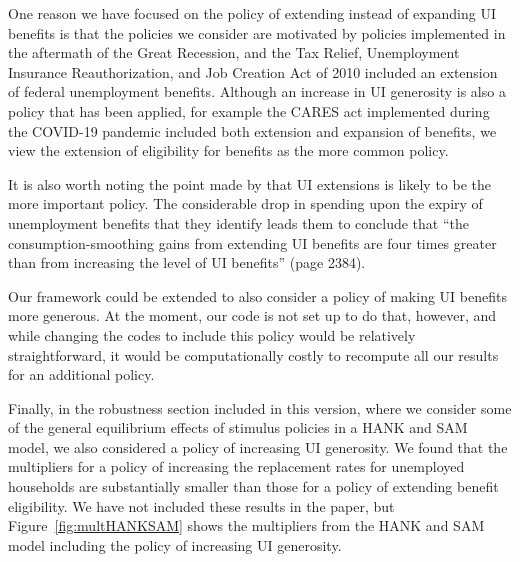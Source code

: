 \documentclass[12pt,letterpaper,english]{article}
\begin{document}
\begin{enumerate}
\begin{enumerate}
		One reason we have focused on the policy of extending instead of expanding UI benefits is that the policies we consider are motivated by policies implemented in the aftermath of the Great Recession, and the Tax Relief, Unemployment Insurance Reauthorization, and Job Creation Act of 2010 included an extension of federal unemployment benefits. Although an increase in UI generosity is also a policy that has been applied, for example the CARES act implemented during the COVID-19 pandemic included both extension and expansion of benefits, we view the extension of eligibility for benefits as the more common policy. 
		
		It is also worth noting the point made by \citet{ganongConsumer2019} that UI extensions is likely to be the more important policy. The considerable drop in spending upon the expiry of unemployment benefits that they identify leads them to conclude that ``the consumption-smoothing gains from extending UI benefits are four times greater than from increasing the level of UI benefits'' (page 2384).
		
		Our framework could be extended to also consider a policy of making UI benefits more generous. At the moment, our code is not set up to do that, however, and while changing the codes to include this policy would be relatively straightforward, it would be computationally costly to recompute all our results for an additional policy. 

		Finally, in the robustness section included in this version, where we consider some of the general equilibrium effects of stimulus policies in a HANK and SAM model, we also considered a policy of increasing UI generosity. We found that the multipliers for a policy of increasing the replacement rates for unemployed households are substantially smaller than those for a policy of extending benefit eligibility. We have not included these results in the paper, but Figure~\ref{fig:multHANKSAM} shows the multipliers from the HANK and SAM model including the policy of increasing UI generosity.
		

\end{enumerate}
\end{enumerate}
\end{document}
